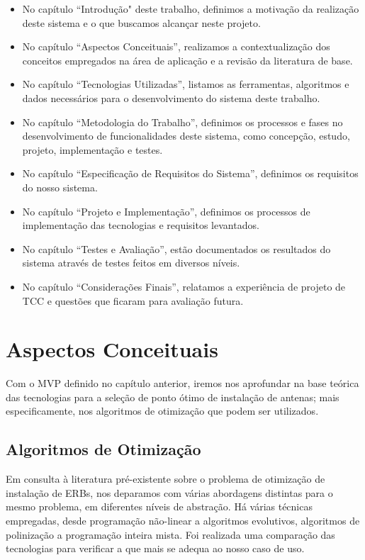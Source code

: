\documentclass[]{politex}
\begin{document}
\begin{itemize}
\item No capítulo ``Introdução" deste trabalho, definimos a motivação da
realização deste sistema e o que buscamos alcançar neste projeto.

\item No capítulo ``Aspectos Conceituais'', realizamos a contextualização
dos conceitos empregados na área de aplicação e a revisão da literatura de base.

\item No capítulo ``Tecnologias Utilizadas'', listamos as ferramentas,
algoritmos e dados necessários para o desenvolvimento do sistema deste trabalho.

\item No capítulo ``Metodologia do Trabalho'', definimos os processos e fases
no desenvolvimento de funcionalidades deste sistema, como concepção, estudo,
projeto, implementação e testes.

\item No capítulo ``Especificação de Requisitos do Sistema'', definimos os
requisitos do nosso sistema.

\item No capítulo ``Projeto e Implementação'', definimos os processos de
implementação das tecnologias e requisitos levantados.

\item No capítulo ``Testes e Avaliação'', estão documentados os resultados do
sistema através de testes feitos em diversos níveis.

\item No capítulo ``Considerações Finais'', relatamos a experiência de projeto
de TCC e questões que ficaram para avaliação futura.

\end{itemize}

\chapter{Aspectos Conceituais}

Com o MVP definido no capítulo anterior, iremos nos aprofundar na base teórica
das tecnologias para a seleção de ponto ótimo de instalação de antenas; mais
especificamente, nos algoritmos de otimização que podem ser utilizados.

\section{Algoritmos de Otimização}
Em consulta à literatura pré-existente sobre o problema de otimização de
instalação de ERBs, nos deparamos com várias abordagens distintas para o mesmo
problema, em diferentes níveis de abstração. Há várias técnicas empregadas,
desde programação não-linear a algoritmos evolutivos, algoritmos de polinização
a programação inteira mista. Foi realizada uma comparação das tecnologias para
verificar a que mais se adequa ao nosso caso de uso.
\end{document}
